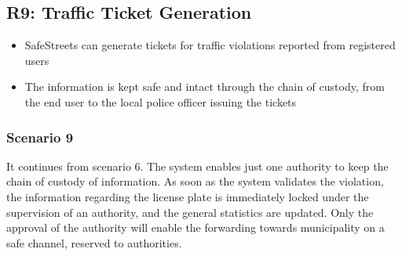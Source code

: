 \subsection{R9: Traffic Ticket Generation}
\begin{itemize}
  \item SafeStreets can generate tickets for traffic violations reported from registered users
  \item The information is kept safe and intact through the chain of custody, from the end user to the local police officer issuing the tickets
\end{itemize}
\subsubsection{Scenario 9}
It continues from scenario 6. The system enables just one authority to keep the chain of custody of information. As soon as the system validates the violation, the information regarding the license plate is immediately locked under the supervision of an authority, and the general statistics are updated. Only the approval of the authority will enable the forwarding towards municipality on a safe channel, reserved to authorities.


